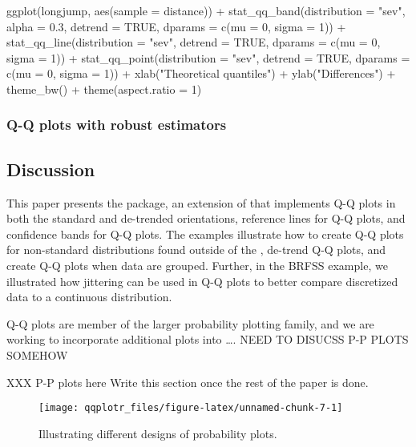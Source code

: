 \begin{Schunk}
\begin{Sinput}
ggplot(longjump, aes(sample = distance)) +
  stat_qq_band(distribution = "sev", alpha = 0.3, detrend = TRUE, dparams = c(mu = 0, sigma = 1)) +
  stat_qq_line(distribution = "sev", detrend = TRUE, dparams = c(mu = 0, sigma = 1)) +
  stat_qq_point(distribution = "sev", detrend = TRUE, dparams = c(mu = 0, sigma = 1)) +
  xlab("Theoretical quantiles") +
  ylab("Differences") +
  theme_bw() +
  theme(aspect.ratio = 1)
\end{Sinput}
\end{Schunk}

\subsubsection{Q-Q plots with robust
estimators}\label{q-q-plots-with-robust-estimators}


\subsection{Discussion}\label{discussion}

This paper presents the  package, an extension of
 that implements Q-Q plots in both the standard and
de-trended orientations, reference lines for Q-Q plots, and confidence
bands for Q-Q plots. The examples illustrate how to create Q-Q plots for
non-standard distributions found outside of the , de-trend
Q-Q plots, and create Q-Q plots when data are grouped. Further, in the
BRFSS example, we illustrated how jittering can be used in Q-Q plots to
better compare discretized data to a continuous distribution.

Q-Q plots are member of the larger probability plotting family, and we
are working to incorporate additional plots into \ldots{}.
NEED TO DISUCSS P-P PLOTS SOMEHOW

XXX P-P plots here Write this section once the rest of the paper is
done.

\begin{Schunk}
\begin{figure}

{\centering \texttt{[image: qqplotr\_files/figure-latex/unnamed-chunk-7-1]} 

}

\caption{\label{fig:pp-designs}Illustrating different designs of probability plots.}\label{fig:unnamed-chunk-7}
\end{figure}
\end{Schunk}

